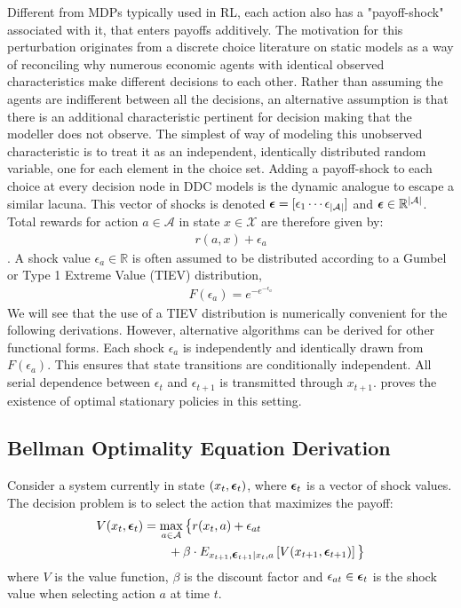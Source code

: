 \documentclass{article}
\renewcommand{\vec}[1]{\mbox{\bm{$#1$}}}
\begin{document}
Different from MDPs typically used in RL, each action also has a "payoff-shock" associated with it, that enters payoffs additively.
The motivation for this perturbation originates from a discrete choice literature \cite{mcfadden1973conditional} on static models as a way of reconciling why numerous economic agents with identical observed characteristics make different decisions to each other. Rather than assuming the agents are indifferent between all the decisions,
an alternative assumption is that there is an additional characteristic pertinent for decision making that the modeller does not observe. The simplest of way of modeling this unobserved characteristic is to treat it as an independent, identically distributed random variable, one for each element in the choice set. Adding a payoff-shock to each choice at every decision node in DDC models is the dynamic analogue to escape a similar lacuna.
This vector of shocks is denoted $\vec{\epsilon} = [ \epsilon_{1} \cdots \epsilon_{|\mathcal{A}|} ]$ and $\vec{\epsilon}\in \mathbb{R}^{|\mathcal{A}|}$. Total rewards for action $a \in \mathcal{A}$ in state $x \in \mathcal{X}$ are therefore given by:
\begin{eqnarray}
r(a,x)+\epsilon_a
\end{eqnarray}
. A shock value $\epsilon_a\in\mathbb{R}$ is often assumed to be distributed according to a Gumbel or Type 1 Extreme Value (TIEV) distribution,
\begin{align}
F(\epsilon_a)=e^{-e^{-\epsilon_a}}
\end{align}
We will see that the use of a TIEV distribution is numerically convenient for the following derivations. However, alternative algorithms can be derived for other functional forms. Each shock $\epsilon_a$ is independently and identically drawn from $F(\epsilon_a)$. This ensures that state transitions are conditionally independent. All serial dependence between $\epsilon_{t}$ and $\epsilon_{t+1}$ is transmitted through $x_{t+1}$. \cite{rust_theory} proves the existence of optimal stationary policies in this setting.

\subsection{Bellman Optimality Equation Derivation}

Consider a system currently in state $(x_t,\vec{\epsilon}_t)$, where $\vec{\epsilon}_t$ is a vector of shock values. The decision problem is to select the action that maximizes the payoff:
\begin{align}
\begin{split}
V(x_t,\vec{\epsilon}_t) & = \max_{a\in\mathcal{A}} \big\{r(x_t,a)+\epsilon_{at} \\
& \qquad + \beta \cdot E_{x_{t+1},\vec{\epsilon}_{t+1}|x_t,a} \left[V(x_{t+1},\vec{\epsilon}_{t+1})\right] \big\} \\
\end{split}
\end{align} 
where $V$ is the value function, $\beta$ is the discount factor and $\epsilon_{at} \in \vec{\epsilon}_t$ is the shock value when selecting action $a$ at time $t$.
\end{document}
